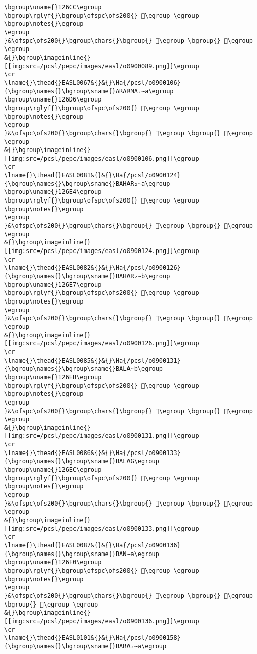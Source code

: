 \begin{verbatim}
\bgroup\uname{}126CC\egroup
\bgroup\rglyf{}\bgroup\ofspc\ofs200{} 𒛌\egroup \egroup
\bgroup\notes{}\egroup
\egroup
}&\ofspc\ofs200{}\bgroup\chars{}\bgroup{} 𒛍\egroup \bgroup{} 𒛌\egroup \egroup
&{}\bgroup\imageinline{}[[img:src=/pcsl/pepc/images/easl/o0900089.png]]\egroup
\cr
\lname{}\thead{}EASL0067&{}&{}\Ha{/pcsl/o0900106}{\bgroup\names{}\bgroup\sname{}ARARMA₂∼a\egroup
\bgroup\uname{}126D6\egroup
\bgroup\rglyf{}\bgroup\ofspc\ofs200{} 𒛖\egroup \egroup
\bgroup\notes{}\egroup
\egroup
}&\ofspc\ofs200{}\bgroup\chars{}\bgroup{} 𒛗\egroup \bgroup{} 𒛖\egroup \egroup
&{}\bgroup\imageinline{}[[img:src=/pcsl/pepc/images/easl/o0900106.png]]\egroup
\cr
\lname{}\thead{}EASL0081&{}&{}\Ha{/pcsl/o0900124}{\bgroup\names{}\bgroup\sname{}BAHAR₂∼a\egroup
\bgroup\uname{}126E4\egroup
\bgroup\rglyf{}\bgroup\ofspc\ofs200{} 𒛤\egroup \egroup
\bgroup\notes{}\egroup
\egroup
}&\ofspc\ofs200{}\bgroup\chars{}\bgroup{} 𒛤\egroup \bgroup{} 𒛥\egroup \egroup
&{}\bgroup\imageinline{}[[img:src=/pcsl/pepc/images/easl/o0900124.png]]\egroup
\cr
\lname{}\thead{}EASL0082&{}&{}\Ha{/pcsl/o0900126}{\bgroup\names{}\bgroup\sname{}BAHAR₂∼b\egroup
\bgroup\uname{}126E7\egroup
\bgroup\rglyf{}\bgroup\ofspc\ofs200{} 𒛧\egroup \egroup
\bgroup\notes{}\egroup
\egroup
}&\ofspc\ofs200{}\bgroup\chars{}\bgroup{} 𒛦\egroup \bgroup{} 𒛧\egroup \egroup
&{}\bgroup\imageinline{}[[img:src=/pcsl/pepc/images/easl/o0900126.png]]\egroup
\cr
\lname{}\thead{}EASL0085&{}&{}\Ha{/pcsl/o0900131}{\bgroup\names{}\bgroup\sname{}BALA∼b\egroup
\bgroup\uname{}126EB\egroup
\bgroup\rglyf{}\bgroup\ofspc\ofs200{} 𒛫\egroup \egroup
\bgroup\notes{}\egroup
\egroup
}&\ofspc\ofs200{}\bgroup\chars{}\bgroup{} 𒛪\egroup \bgroup{} 𒛫\egroup \egroup
&{}\bgroup\imageinline{}[[img:src=/pcsl/pepc/images/easl/o0900131.png]]\egroup
\cr
\lname{}\thead{}EASL0086&{}&{}\Ha{/pcsl/o0900133}{\bgroup\names{}\bgroup\sname{}BALAG\egroup
\bgroup\uname{}126EC\egroup
\bgroup\rglyf{}\bgroup\ofspc\ofs200{} 𒛬\egroup \egroup
\bgroup\notes{}\egroup
\egroup
}&\ofspc\ofs200{}\bgroup\chars{}\bgroup{} 𒛬\egroup \bgroup{} 𒛭\egroup \egroup
&{}\bgroup\imageinline{}[[img:src=/pcsl/pepc/images/easl/o0900133.png]]\egroup
\cr
\lname{}\thead{}EASL0087&{}&{}\Ha{/pcsl/o0900136}{\bgroup\names{}\bgroup\sname{}BAN∼a\egroup
\bgroup\uname{}126F0\egroup
\bgroup\rglyf{}\bgroup\ofspc\ofs200{} 𒛰\egroup \egroup
\bgroup\notes{}\egroup
\egroup
}&\ofspc\ofs200{}\bgroup\chars{}\bgroup{} 𒛮\egroup \bgroup{} 𒛯\egroup \bgroup{} 𒛰\egroup \egroup
&{}\bgroup\imageinline{}[[img:src=/pcsl/pepc/images/easl/o0900136.png]]\egroup
\cr
\lname{}\thead{}EASL0101&{}&{}\Ha{/pcsl/o0900158}{\bgroup\names{}\bgroup\sname{}BARA₂∼a\egroup

\end{verbatim}
